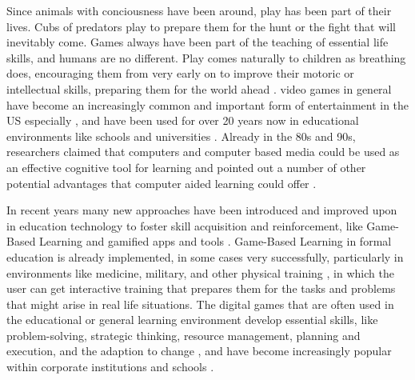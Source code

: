 Since animals with conciousness have been around, play has been part of their lives. Cubs of predators play to prepare them for the hunt or the fight that will inevitably come. Games always have been part of the teaching of essential life skills, and humans are no different. Play comes naturally to children as breathing does, encouraging them from very early on to improve their motoric or intellectual skills, preparing them for the world ahead \cite{traditional} \cite{lifelong}.
video games in general have become an increasingly common and important form of entertainment in the US especially \cite{engage}, and have been used for over 20 years now in educational environments like schools and universities \cite{compare}.
Already in the 80s and 90s, researchers claimed that computers and computer based media could be used as an effective cognitive tool for learning and pointed out a number of other potential advantages that computer aided learning could offer \cite{aspects}.

In recent years many new approaches have been introduced and improved upon in education technology to foster skill acquisition and reinforcement, like Game-Based Learning and gamified apps and tools \cite{gamific}.
Game-Based Learning in formal education is already implemented, in some cases very successfully, particularly in environments like medicine, military, and other physical training \cite{aspects}, in which the user can get interactive training that prepares them for the tasks and problems that might arise in real life situations.
The digital games that are often used in the educational or general learning environment develop essential skills, like problem-solving, strategic thinking, resource management, planning and execution, and the adaption to change \cite{model}, and have become increasingly popular within corporate institutions and schools \cite{gamific}.


